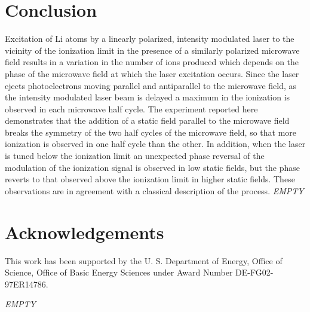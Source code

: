 \documentclass[aps,pra,preprint,groupedaddress]{revtex4-1}
\begin{document}
\section{\label{sec:conc} Conclusion}

Excitation of Li atoms by a linearly polarized, intensity modulated laser to the vicinity of the ionization limit in the presence of a similarly polarized microwave field results in a variation in the number of ions produced which depends on the phase of the microwave field at which the laser excitation occurs. Since the laser ejects photoelectrons moving parallel and antiparallel to the microwave field, as the intensity modulated laser beam is delayed a maximum in the ionization is observed in each microwave half cycle. The experiment reported here demonstrates that the addition of a static field parallel to the microwave field breaks the symmetry of the two half cycles of the microwave field, so that more ionization is observed in one half cycle than the other. In addition, when the laser is tuned below the ionization limit an unexpected phase reversal of the modulation of the ionization signal is observed in low static fields, but the phase reverts to that observed above the ionization limit in higher static fields. These observations are in agreement with a classical description of the process.
\emph{EMPTY}

\section{\label{sec:ack} Acknowledgements}

This work has been supported by the U. S. Department of Energy, Office of Science, Office of Basic Energy Sciences under Award Number DE-FG02-97ER14786.






\emph{EMPTY}


\end{document}
